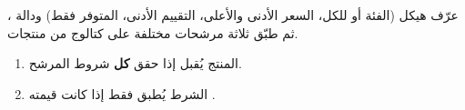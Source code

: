 \begin{statement}
عرّف هيكل  (الفئة أو  للكل، السعر الأدنى والأعلى، التقييم الأدنى، المتوفر فقط) ودالة ، ثم طبّق ثلاثة مرشحات مختلفة على كتالوج من  منتجات.
\end{statement}
\begin{stepsbox}\begin{enumerate}
\item المنتج يُقبل إذا حقق \textbf{كل} شروط المرشح.
\item الشرط  يُطبق فقط إذا كانت قيمته .
\end{enumerate}\end{stepsbox}

